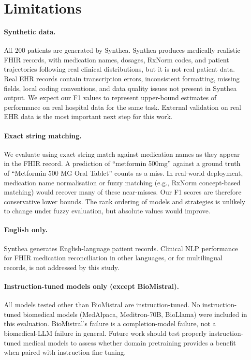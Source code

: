 \section{Limitations}
\label{sec:limitations}

\paragraph{Synthetic data.}
All 200 patients are generated by Synthea. Synthea produces medically realistic
FHIR records, with medication names, dosages, RxNorm codes, and patient trajectories
following real clinical distributions, but it is not real patient data. Real EHR records
contain transcription errors, inconsistent formatting, missing fields, local coding
conventions, and data quality issues not present in Synthea output. We expect our F1
values to represent upper-bound estimates of performance on real hospital data for the
same task. External validation on real EHR data is the most important next step for
this work.

\paragraph{Exact string matching.}
We evaluate using exact string match against medication names as they appear in the
FHIR record. A prediction of ``metformin 500mg'' against a ground truth of ``Metformin
500 MG Oral Tablet'' counts as a miss. In real-world deployment, medication name
normalisation or fuzzy matching (e.g., RxNorm concept-based matching) would recover
many of these near-misses. Our F1 scores are therefore conservative lower bounds.
The rank ordering of models and strategies is unlikely to change under fuzzy evaluation,
but absolute values would improve.

\paragraph{English only.}
Synthea generates English-language patient records. Clinical NLP performance for
FHIR medication reconciliation in other languages, or for multilingual records, is
not addressed by this study.

\paragraph{Instruction-tuned models only (except BioMistral).}
All models tested other than BioMistral are instruction-tuned. No instruction-tuned
biomedical models (MedAlpaca, Meditron-70B, BioLlama) were included in this evaluation.
BioMistral's failure is a completion-model failure, not a biomedical-LLM failure in
general. Future work should test properly instruction-tuned medical models to assess
whether domain pretraining provides a benefit when paired with instruction fine-tuning.

